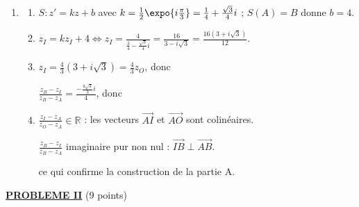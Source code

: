 \begin{description}
\begin{enumerate}
\begin{enumerate}
				$z_O = \frac{z_B + z_C}{2}$, soit \par\noindent{}
		\end{enumerate}
		\item
		\begin{enumerate}
			\item {}
				$S : z' = kz + b$ avec $k = \frac{1}{2}\expo{i\frac{\pi}{3}} = \frac{1}{4} + \frac{\sqrt{3}}{4} i$ ; $S(A) = B$ donne $b = 4$.
				\par\noindent{}
			\item {}
				$z_I = k z_I + 4 \iff z_I = \frac{4}{\frac{3}{4} - \frac{\sqrt{3}}{4} i} = \frac{16}{3 - i\sqrt{3}} = \frac{16(3 + i\sqrt{3})}{12}$.
				\par\noindent{}
			\item {}
				$z_I = \frac{4}{3}(3 + i\sqrt{3}) = \frac{4}{3} z_O$, donc \par\noindent{}
				$\frac{z_B - z_I}{z_B - z_A} = \frac{-\frac{4\sqrt{3}}{3} i}{4}$, donc \par\noindent{}
			\item {}
				$\frac{z_I - z_A}{z_O - z_A} \in \mathbb{R}$ : les vecteurs $\overrightarrow{AI}$ et $\overrightarrow{AO}$ sont colinéaires.
				\par\noindent{}
				$\frac{z_B - z_I}{z_B - z_A}$ imaginaire pur non nul : $\overrightarrow{IB} \perp \overrightarrow{AB}$.
				\par\noindent{}
				ce qui confirme la construction de la partie A.
		\end{enumerate}
	\end{enumerate}
\end{description}
\noindent \underline{\textsc{\textbf{PROBLEME II}}} (9 points)

